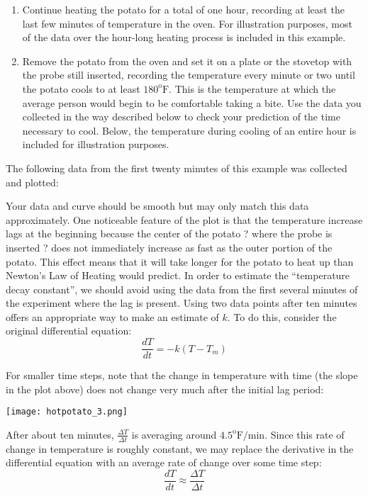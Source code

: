 \documentclass{ximera}
\begin{document}
\begin{enumerate}
\item Continue heating the potato for a total of one hour, recording at least the last few minutes of temperature in the oven.  For illustration purposes, most of the data over the hour-long heating process is included in this example.
\item Remove the potato from the oven and set it on a plate or the stovetop with the probe still inserted, recording the temperature every minute or two until the potato cools to at least $180^{\text{o}}\text{F}$. This is the temperature at which the average person would begin to be comfortable taking a bite.  Use the data you collected in the way described below to check your prediction of the time necessary to cool.  Below, the temperature during cooling of an entire hour is included for illustration purposes.
\end{enumerate}

The following data from the first twenty minutes of this example was collected and plotted:

\begin{center}  
\end{center}

Your data and curve should be smooth but may only match this data approximately.  One noticeable feature of the plot is that the temperature increase lags at the beginning because the center of the potato ? where the probe is inserted ? does not immediately increase as fast as the outer portion of the potato.  This effect means that it will take longer for the potato to heat up than Newton's Law of Heating would predict.  In order to estimate the ``temperature decay constant'', we should avoid using the data from the first several minutes of the experiment where the lag is present.  Using two data points after ten minutes offers an appropriate way to make an estimate of $k$.  To do this, consider the original differential equation:
\[
\frac{dT}{dt}=-k(T-T_m)
\]

For smaller time steps, note that the change in temperature with time (the slope in the plot above) does not change very much after the initial lag period:

\begin{image}
\texttt{[image: hotpotato\_3.png]}
\end{image}

After about ten minutes, $\frac{\Delta T}{\Delta t}$ is averaging around $4.5^{\text{o}}\text{F}/\text{min}$. Since this rate of change in temperature is roughly constant, we may replace the derivative in the differential equation with an average rate of change over some time step:
\[
\frac{dT}{dt}\approx \frac{\Delta T}{\Delta t}
\]
\end{document}

